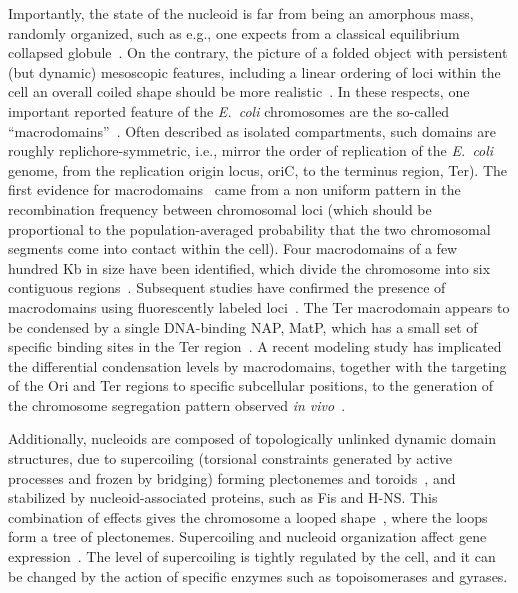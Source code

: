 \documentclass[
preprint,
a4paper,
12pt,
superscriptaddress,
pre]{revtex4}
\begin{document}
Importantly, the state of the nucleoid is far from being an amorphous
mass, randomly organized, such as e.g., one expects from a classical
equilibrium collapsed globule~\cite{Mirny2011}. On the contrary, the
picture of a folded object with persistent (but dynamic) mesoscopic
features, including a linear ordering of loci within the cell an
overall coiled shape should be more
realistic~\cite{WLP+06,Wiggins2010,HadizadehYazdi2012,Fisher2013,Pelletier2012}.
In these respects, one important reported feature of the
\emph{E.~coli} chromosomes are the so-called
``macrodomains''~\cite{VPR+04,MRB05,EB06}. Often described as isolated
compartments, such domains are roughly replichore-symmetric, i.e.,
mirror the order of replication of the \emph{E.~coli} genome, from the
replication origin locus, oriC, to the terminus region, Ter). The
first evidence for macrodomains~\cite{VPR+04} came from a non uniform
pattern in the recombination frequency between chromosomal loci (which
should be proportional to the population-averaged probability that the
two chromosomal segments come into contact within the cell).
%
Four macrodomains of a few hundred Kb in size have been identified,
which divide the chromosome into six contiguous
regions~\cite{Dame2011,Benza2012}.  Subsequent studies have confirmed
the presence of macrodomains using fluorescently labeled
loci~\cite{EMB08,EB06,LMB+05}. The Ter macrodomain appears to be
condensed by a single DNA-binding NAP, MatP, which has a small set
of specific binding sites in the Ter region~\cite{Mercier2008}.
A recent modeling study has implicated the differential condensation
levels by macrodomains, together with the targeting of the Ori and Ter
regions to specific subcellular positions, to the generation of the
chromosome segregation pattern observed \emph{in
  vivo}~\cite{Junier2013}.

Additionally, nucleoids are composed of topologically unlinked dynamic
domain structures, due to supercoiling (torsional constraints
generated by active processes and frozen by bridging) forming
plectonemes and toroids~\cite{Trun1998}, and stabilized by
nucleoid-associated proteins, such as Fis and H-NS. This combination
of effects gives the chromosome a looped
shape~\cite{Postow2004,Skoko2006,Kavenoff1976}, where the loops form a
tree of plectonemes. Supercoiling and nucleoid organization affect
gene expression~\cite{Breier2004,Postow2004,Dillon2010}.
The level of supercoiling is tightly regulated by the cell, and it can
be changed by the action of specific enzymes such as topoisomerases
and gyrases.
\end{document}
